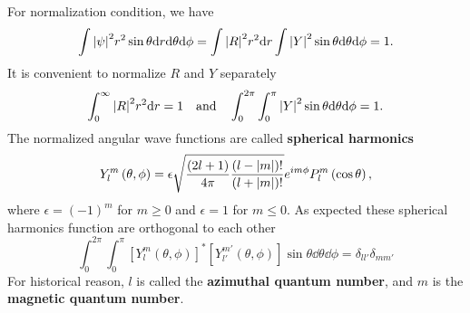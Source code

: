 For normalization condition, we have
\begin{equation}
  \label{eq:4-18}
  \int \abs{\psi}^2 r^2 \sin\theta \dd r \dd \theta \dd \phi = \int \abs{R}^2 r^2 \dd r \int \abs{Y}^2 \sin\theta \dd \theta \dd \phi = 1.
\end{equation}
It is convenient to normalize $R$ and $Y$ separately
\begin{equation}
  \label{eq:4-19}
  \int_0^{\infty} \abs{R}^2 r^2 \dd r =1 ~ ~ ~ \text{and} ~ ~ ~ \int_0^{2\pi}\int_0^{\pi} \abs{Y}^2 \sin\theta \dd \theta \dd \phi =1.
\end{equation}
The normalized angular wave functions are called \textbf{spherical harmonics}
\begin{equation}
  \label{eq:4-20}
  Y_l^m \left( \theta,\phi \right) = \epsilon \sqrt{ \frac{\left( 2l+1 \right)}{4\pi} \frac{\left( l-\abs{m} \right)!}{\left( l+\abs{m} \right)!}} e^{im\phi} P_l^m \left( \cos\theta \right),
\end{equation}
where $\epsilon=\left( -1 \right)^{m}$ for $m \geq 0$ and $\epsilon=1$ for $m \leq 0$.
As expected these spherical harmonics function are orthogonal to each other
\begin{equation}
  \label{eq:4-21}
  \int_0^{2\pi} \int_0^{\pi} \left[ Y_l^m \left( \theta,\phi \right) \right]^{*} \left[ Y_{l'}^{m'} \left( \theta,\phi \right) \right] \sin \theta \dd \theta \dd \phi = \delta_{ll'} \delta_{mm'}
\end{equation}
For historical reason, $l$ is called the \textbf{azimuthal quantum number}, and $m$ is the \textbf{magnetic quantum number}.

